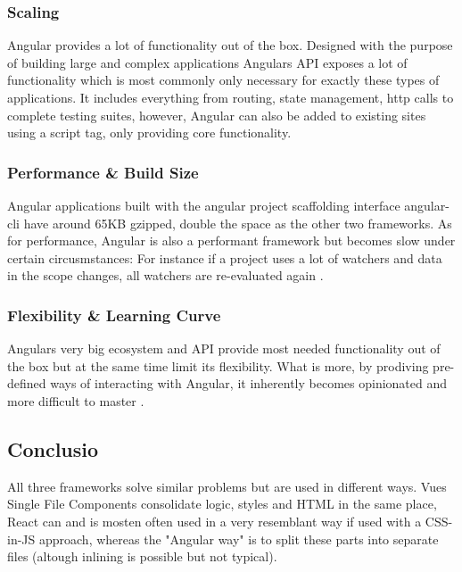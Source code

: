\subsubsection{Scaling}
Angular provides a lot of functionality out of the box. Designed with the purpose of building large and complex applications Angulars API exposes a lot of functionality which is most commonly only necessary for exactly these types of applications. It includes everything from routing, state management, http calls to complete testing suites, however, Angular can also be added to existing sites using a script tag, only providing core functionality.

\subsubsection{Performance \& Build Size}
Angular applications built with the angular project scaffolding interface angular-cli have around 65KB gzipped, double the space as the other two frameworks. As for performance, Angular is also a performant framework \cite{FrameworksPerformance:online} but becomes slow under certain circusmstances: For instance if a project uses a lot of watchers and data in the scope changes, all watchers are re-evaluated again \cite{ComparisonVue:online}.

\subsubsection{Flexibility \& Learning Curve}
 Angulars very big ecosystem and API provide most needed functionality out of the box but at the same time limit its flexibility. What is more, by prodiving pre-defined ways of interacting with Angular, it inherently becomes opinionated and more difficult to master \cite{ComparisonVue:online}.


\subsection{Conclusio}
All three frameworks solve similar problems but are used in different ways. Vues Single File Components consolidate logic, styles and HTML in the same place, React can and is mosten often used in a very resemblant way if used with a CSS-in-JS approach, whereas the "Angular way" is to split these parts into separate files (altough inlining is possible but not typical). 

